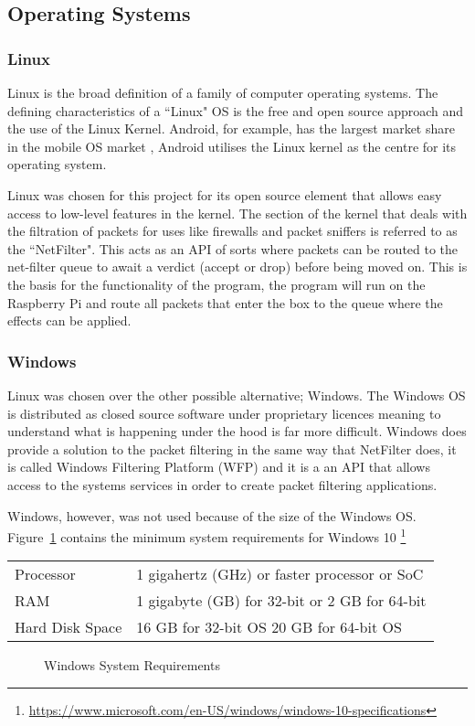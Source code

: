 \subsection{Operating Systems}

\subsubsection{Linux}
Linux is the broad definition of a family of computer operating systems. The defining characteristics of a ``Linux" OS is the free and open source approach and the use of the Linux Kernel. Android, for example, has the largest market share in the mobile OS market \citep{share2015desktop}, Android utilises the Linux kernel as the centre for its operating system.

Linux was chosen for this project for its open source element that allows easy access to low-level features in the kernel. The section of the kernel that deals with the filtration of packets for uses like firewalls and packet sniffers is referred to as the ``NetFilter". This acts as an API of sorts where packets can be routed to the net-filter queue to await a verdict (accept or drop) before being moved on. This is the basis for the functionality of the program, the program will run on the Raspberry Pi and route all packets that enter the box to the queue where the effects can be applied.


\subsubsection{Windows}
\label{ref:Windows}
Linux was chosen over the other possible alternative; Windows. The Windows OS is distributed as closed source software under proprietary licences meaning to understand what is happening under the hood is far more difficult. Windows does provide a solution to the packet filtering in the same way that NetFilter does, it is called Windows Filtering Platform (WFP) and it is a an API that allows access to the systems services in order to create packet filtering applications.

Windows, however, was not used because of the size of the Windows OS. Figure~\ref{ref:windowsRequire} contains the minimum system requirements for Windows 10 \footnote{\url{https://www.microsoft.com/en-US/windows/windows-10-specifications}}


\vspace{5mm} 
\begin{center}
\begin{tabular}{| l | l |}
	\hline
	Processor & 1 gigahertz (GHz) or faster processor or SoC \\
	RAM & 1 gigabyte (GB) for 32-bit or 2 GB for 64-bit \\
	Hard Disk Space & 16 GB for 32-bit OS 20 GB for 64-bit OS \\
	\hline
\end{tabular}
\begin{figure}[h]
		\caption{Windows System Requirements}
	\label{ref:windowsRequire}
	\end{figure}
\end{center}

